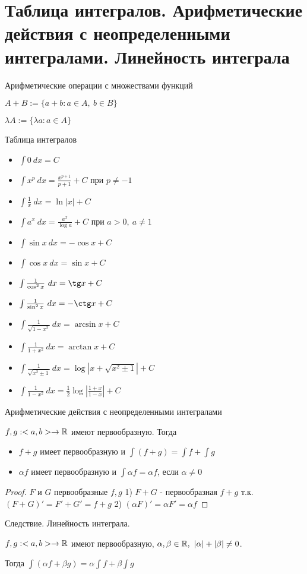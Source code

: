 \section{Таблица интегралов. Арифметические действия с неопределенными интегралами. Линейность интеграла}
\begin{conj}
    Арифметические операции с множествами функций

    $A+B := \{a+b: a \in A,\ b \in B\}$

    $\lambda A := \{ \lambda a : a \in A\}$
\end{conj}

Таблица интегралов

\begin{itemize}
    \item $\int 0\ dx = C$
    \item $\int x^p\ dx = \frac{x^{p+1}}{p+1} + C$ при $p \neq -1$
    \item $\int \frac{1}{x}\ dx = \ln |x| + C$
    \item $\int a^x\ dx = \frac{a^x}{\log a} + C$ при $a>0,\ a\neq 1$
    \item $\int \sin x\ dx = -\cos x + C$
    \item $\int \cos x\ dx = \sin x + C$
    \item $\int \frac{1}{\cos^2 x}\ dx = \tg x + C$
    \item $\int \frac{1}{\sin^2 x}\ dx = -\ctg x + C$
    \item $\int \frac{1}{\sqrt{1-x^2}}\ dx = \arcsin x + C$
    \item $\int \frac{1}{1+x^2}\ dx = \arctan x + C$
    \item $\int \frac{1}{\sqrt{x^2\pm 1}}\ dx = \log|x+\sqrt{x^2\pm 1}| + C$
    \item $\int \frac{1}{1-x^2}\ dx = \frac{1}{2}\log |\frac{1+x}{1-x}| + C$   
\end{itemize}

\begin{conj}
    Арифметические действия с неопределенными интегралами

    $f, g:<a, b> \to \mathbb{R}$ имеют первообразную. Тогда
    \begin{itemize}
        \item $f+g$ имеет первообразную и $\int(f+g) = \int f + \int g$
        \item $\alpha f$ имеет первообразную и $\int \alpha f = \alpha f$, если $\alpha \neq 0$
    \end{itemize}
\end{conj}

\begin{proof}
    $F$ и $G$ первообразные $f, g$
    1) $F+G$ - первообразная $f+g$ т.к. $(F+G)'=F'+G'=f+g$
    2) $(\alpha F)' = \alpha F' = \alpha f$
\end{proof}

Следствие. Линейность интеграла.

$f, g: <a, b> \to \mathbb{R}$ имеют первообразную, $\alpha, \beta \in \R,\ |\alpha|+|\beta|\neq 0$.

Тогда $\int (\alpha f + \beta g) = \alpha \int f + \beta \int g$